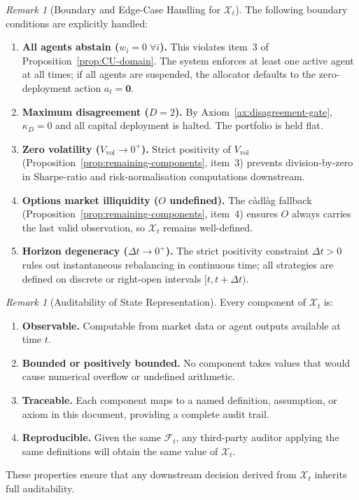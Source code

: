 \documentclass[12pt,openany]{book}
\newcommand{\calF}{\mathcal{F}}
\newcommand{\calX}{\mathcal{X}}
\numberwithin{equation}{chapter}
\theoremstyle{plain}
\theoremstyle{definition}
\theoremstyle{remark}
\newtheorem{remark}[theorem]{Remark}
\numberwithin{equation}{chapter}
\theoremstyle{plain}
\begin{document}
\begin{remark}[Boundary and Edge-Case Handling for $\calX_t$]
\label{rem:state-boundary}
The following boundary conditions are explicitly handled:
\begin{enumerate}
  \item \textbf{All agents abstain ($w_i = 0\;\forall i$).}
    This violates item~3 of Proposition~\ref{prop:CU-domain}.
    The system enforces at least one active agent at all times;
    if all agents are suspended, the allocator defaults to the
    zero-deployment action $a_t = \mathbf{0}$.

  \item \textbf{Maximum disagreement ($D = 2$).}
    By Axiom~\ref{ax:disagreement-gate}, $\kappa_D = 0$ and all
    capital deployment is halted.  The portfolio is held flat.

  \item \textbf{Zero volatility ($V_{\mathrm{vol}} \to 0^+$).}
    Strict positivity of $V_{\mathrm{vol}}$ (Proposition~\ref{prop:remaining-components},
    item~3) prevents division-by-zero in Sharpe-ratio and
    risk-normalisation computations downstream.

  \item \textbf{Options market illiquidity ($O$ undefined).}
    The càdlàg fallback (Proposition~\ref{prop:remaining-components},
    item~4) ensures $O$ always carries the last valid observation,
    so $\calX_t$ remains well-defined.

  \item \textbf{Horizon degeneracy ($\Delta t \to 0^+$).}
    The strict positivity constraint $\Delta t > 0$ rules out
    instantaneous rebalancing in continuous time; all strategies
    are defined on discrete or right-open intervals
    $[t, t + \Delta t)$.
\end{enumerate}
\end{remark}

\begin{remark}[Auditability of State Representation]
\label{rem:state-auditability}
Every component of $\calX_t$ is:
\begin{enumerate}
  \item \textbf{Observable.} Computable from market data or agent
    outputs available at time $t$.
  \item \textbf{Bounded or positively bounded.} No component takes
    values that would cause numerical overflow or undefined
    arithmetic.
  \item \textbf{Traceable.} Each component maps to a named
    definition, assumption, or axiom in this document, providing
    a complete audit trail.
  \item \textbf{Reproducible.} Given the same $\calF_t$, any
    third-party auditor applying the same definitions will obtain
    the same value of $\calX_t$.
\end{enumerate}
These properties ensure that any downstream decision derived from
$\calX_t$ inherits full auditability.
\end{remark}
\end{document}
